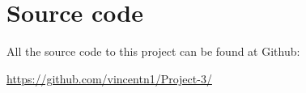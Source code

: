 \documentclass[10pt,a4paper]{article}
\begin{document}


\section{Source code}

All the source code to this project can be found at Github:

\url{https://github.com/vincentn1/Project-3/}
\end{document}
